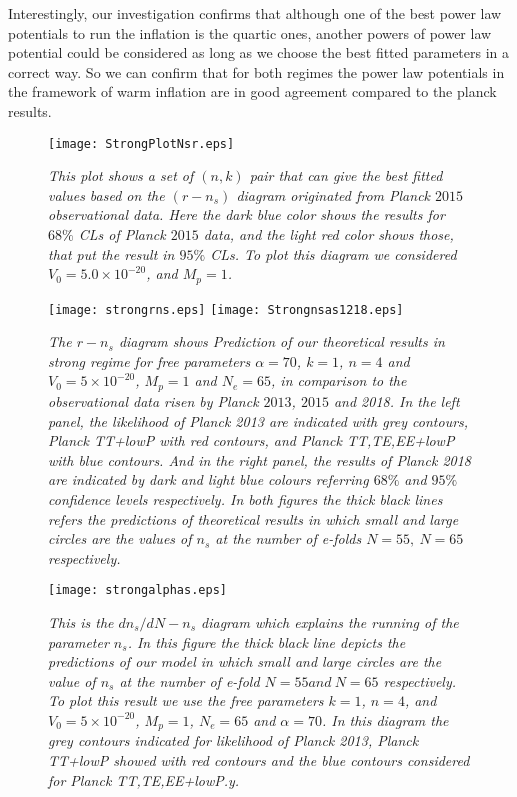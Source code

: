 \documentclass[12pt]{revtex4}
\begin{document}
Interestingly, our investigation confirms that although one of the best power law potentials to run the inflation is the quartic ones, another { powers of power law potential} could be considered as long as we choose the best fitted parameters in a {correct} way. So we can confirm that for both regimes the power law potentials in the framework of warm inflation are in good agreement compared to the planck results.
\begin{figure}[ht]
\centering
\texttt{[image: StrongPlotNsr.eps]}
\caption{{\it{
 This plot shows a set of $(n,k)$ pair that can give the best fitted values based on the  $(r-n_s)$ diagram originated from Planck $2015$ observational data. Here the dark blue color shows the results for $68\%$ CLs of Planck $2015$ data, and the light red color shows those, that put the result in $95\%$ CLs. To plot this diagram we considered $V_0=5.0\times10^{-20}$, and $M_p=1$.}}}
\label{StrongPlotNsraa}
\end{figure}
\begin{figure}[ht]
\centering
\texttt{[image: strongrns.eps]}
\texttt{[image: Strongnsas1218.eps]}
\caption{{\it{
 The $r-n_s$ diagram shows  Prediction of
our theoretical results  in strong regime for free parameters  $\alpha=70$, $k=1$,  $n=4$ and $V_0=5\times10^{-20}$, $M_p=1$ and $N_e=65$,
in comparison to the observational data risen by Planck $2013$, $2015$ and 2018. In the left panel, the likelihood  of  Planck 2013 are indicated with grey contours, Planck TT+lowP with red contours, and Planck TT,TE,EE+lowP with blue contours. And in the right panel, the results of Planck 2018 are indicated by dark and light blue colours referring $68\%$ and $95\%$ confidence levels respectively. In both figures the thick black lines
refers the predictions of theoretical results in which small and large circles are the values of $n_s$ at the number of e-folds $N=55,~N=65$ respectively.
}}}
\label{fignsrstrong}
\end{figure}
\begin{figure}[ht]
\centering
\texttt{[image: strongalphas.eps]}
\caption{{\it{
 This is the $d{n_s}/dN - {n_s}$ diagram which explains the running of the parameter ${n_s}$. In this figure the thick black line
depicts the predictions of our model in which small and large circles are the value of $n_s$ at the number of e-fold $N=55 and ~N=65$ respectively. To plot this result we use the free parameters $k=1$,  $n=4$,  and $V_0=5\times 10^{-20}$, $M_p=1$, $N_e=65$ and $\alpha=70$.
In this diagram  the grey contours indicated for likelihood  of  Planck 2013, Planck TT+lowP showed with red contours and the blue contours considered for Planck TT,TE,EE+lowP.y.}}}
\label{strongfignsdns}
\end{figure}
\end{document}
